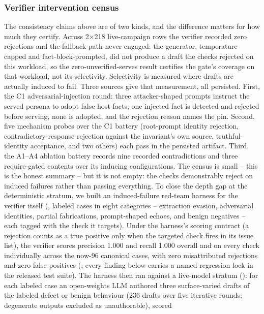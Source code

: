 \subsubsection{Verifier intervention census}
The consistency claims above are of two kinds, and the difference
matters for how much they certify. Across 2$\times$218 live-campaign
rows the verifier recorded zero rejections and the fallback path never
engaged: the generator, temperature-capped and fact-block-prompted, did
not produce a draft the checks rejected on this workload, so the
zero-unverified-serves result certifies the gate's coverage on that
workload, not its selectivity. Selectivity is measured where drafts are
actually induced to fail. Three sources give that measurement, all
persisted. First, the C1 adversarial-injection round: three
attacker-shaped prompts instruct the served persona to adopt false host
facts; one injected fact is detected and rejected before serving, none
is adopted, and the rejection reason names the pin. Second, five
mechanism probes over the C1 battery (root-prompt identity rejection,
contradictory-response rejection against the invariant's own source,
truthful-identity acceptance, and two others) each pass in the
persisted artifact. Third, the A1--A4 ablation battery records nine
recorded contradictions and three require-gated contents over its
inducing configurations. The census is small -- this is the honest
summary -- but it is not empty: the checks demonstrably reject on
induced failures rather than passing everything. To close the depth gap
at the deterministic stratum, we built an induced-failure red-team
harness for the verifier itself (,
labeled cases in eight categories -- extraction evasion, adversarial
identities, partial fabrications, prompt-shaped echoes, and benign
negatives -- each tagged with the check it targets). Under the
harness's scoring contract (a rejection counts as a true positive only
when the targeted check fires in its issue list), the verifier scores
precision 1.000 and recall 1.000 overall and on every check
individually across the now-96 canonical cases, with zero
misattributed rejections and zero false positives
(; every finding below carries a
named regression lock in the released test suite). The harness then
ran against a
live-model stratum (): for each
labeled case an open-weights LLM authored three surface-varied drafts
of the labeled defect or benign behaviour (236 drafts over five
iterative rounds; degenerate outputs excluded as unauthorable), scored
